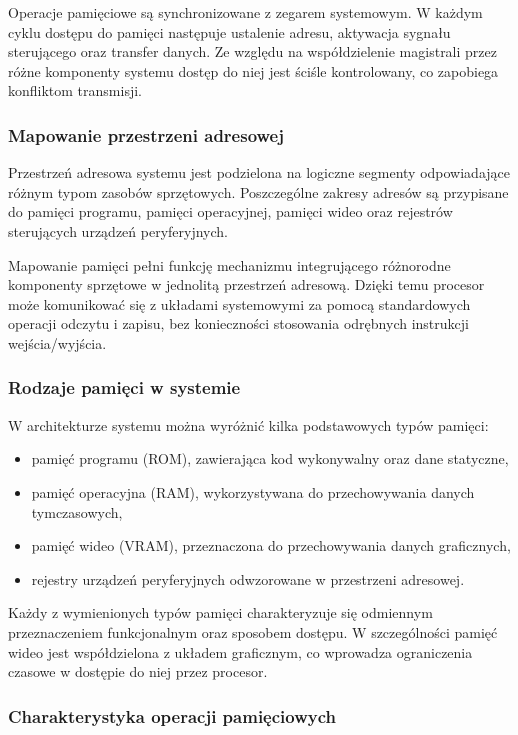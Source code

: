 \documentclass{article}
\begin{document}
Operacje pamięciowe są synchronizowane z zegarem systemowym. W każdym cyklu dostępu do pamięci następuje ustalenie adresu, aktywacja sygnału sterującego oraz transfer danych. Ze względu na współdzielenie magistrali przez różne komponenty systemu dostęp do niej jest ściśle kontrolowany, co zapobiega konfliktom transmisji.

\subsubsection{Mapowanie przestrzeni adresowej}

Przestrzeń adresowa systemu jest podzielona na logiczne segmenty odpowiadające różnym typom zasobów sprzętowych. Poszczególne zakresy adresów są przypisane do pamięci programu, pamięci operacyjnej, pamięci wideo oraz rejestrów sterujących urządzeń peryferyjnych.

Mapowanie pamięci pełni funkcję mechanizmu integrującego różnorodne komponenty sprzętowe w jednolitą przestrzeń adresową. Dzięki temu procesor może komunikować się z układami systemowymi za pomocą standardowych operacji odczytu i zapisu, bez konieczności stosowania odrębnych instrukcji wejścia/wyjścia.

\subsubsection{Rodzaje pamięci w systemie}

W architekturze systemu można wyróżnić kilka podstawowych typów pamięci:

\begin{itemize}
	\item pamięć programu (ROM), zawierająca kod wykonywalny oraz dane statyczne,
	\item pamięć operacyjna (RAM), wykorzystywana do przechowywania danych tymczasowych,
	\item pamięć wideo (VRAM), przeznaczona do przechowywania danych graficznych,
	\item rejestry urządzeń peryferyjnych odwzorowane w przestrzeni adresowej.
\end{itemize}

Każdy z wymienionych typów pamięci charakteryzuje się odmiennym przeznaczeniem funkcjonalnym oraz sposobem dostępu. W szczególności pamięć wideo jest współdzielona z układem graficznym, co wprowadza ograniczenia czasowe w dostępie do niej przez procesor.

\subsubsection{Charakterystyka operacji pamięciowych}
\end{document}
